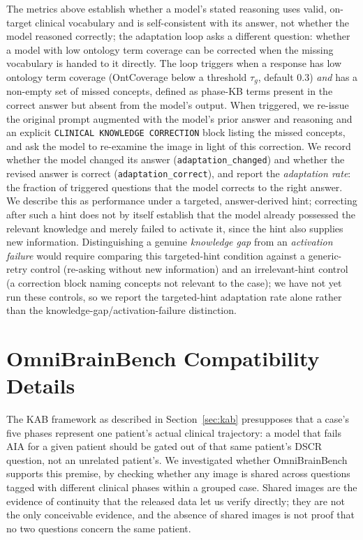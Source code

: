 \documentclass[11pt]{article}
\begin{document}
The metrics above establish whether a model's stated reasoning uses valid, on-target clinical vocabulary and is self-consistent with its answer, not whether the model reasoned correctly; the adaptation loop asks a different question: whether a model with low ontology term coverage can be corrected when the missing vocabulary is handed to it directly. The loop triggers when a response has low ontology term coverage (OntCoverage below a threshold $\tau_g$, default $0.3$) \emph{and} has a non-empty set of missed concepts, defined as phase-KB terms present in the correct answer but absent from the model's output. When triggered, we re-issue the original prompt augmented with the model's prior answer and reasoning and an explicit \texttt{CLINICAL KNOWLEDGE CORRECTION} block listing the missed concepts, and ask the model to re-examine the image in light of this correction. We record whether the model changed its answer (\texttt{adaptation\_changed}) and whether the revised answer is correct (\texttt{adaptation\_correct}), and report the \emph{adaptation rate}: the fraction of triggered questions that the model corrects to the right answer. We describe this as performance under a targeted, answer-derived hint; correcting after such a hint does not by itself establish that the model already possessed the relevant knowledge and merely failed to activate it, since the hint also supplies new information. Distinguishing a genuine \emph{knowledge gap} from an \emph{activation failure} would require comparing this targeted-hint condition against a generic-retry control (re-asking without new information) and an irrelevant-hint control (a correction block naming concepts not relevant to the case); we have not yet run these controls, so we report the targeted-hint adaptation rate alone rather than the knowledge-gap/activation-failure distinction.



\section{OmniBrainBench Compatibility Details}
\label{sec:app-compat}

The KAB framework as described in Section~\ref{sec:kab} presupposes that a case's five phases represent one patient's actual clinical trajectory: a model that fails AIA for a given patient should be gated out of that same patient's DSCR question, not an unrelated patient's. We investigated whether OmniBrainBench \citep{peng2026omnibrainbench} supports this premise, by checking whether any image is shared across questions tagged with different clinical phases within a grouped case. Shared images are the evidence of continuity that the released data let us verify directly; they are not the only conceivable evidence, and the absence of shared images is not proof that no two questions concern the same patient.
\end{document}
